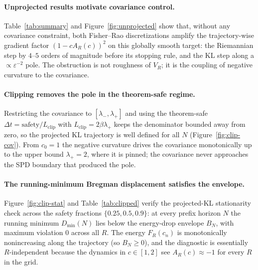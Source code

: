 \documentclass[11pt]{article}
\begin{document}
\begin{table}[t]
\centering
{}
\caption{Unprojected diagnostics. Riemannian rows report the maximum FR gradient
norm along each cascade and the stop reason; the KL row reports the log--log
pole-window slope; the BW rows report the final running minimum and envelope
check.}
\label{tab:summary}
\end{table}

\paragraph{Unprojected results motivate covariance control.}
Table~\ref{tab:summary} and Figure~\ref{fig:unprojected} show that, without any
covariance constraint, both Fisher--Rao discretizations amplify the
trajectory-wise gradient factor $(1-cA_R(c))^2$ on this globally smooth target:
the Riemannian step by $4$--$5$ orders of magnitude before its stopping rule, and
the KL step along a $\propto\varepsilon^{-2}$ pole. The obstruction is not
roughness of $V_R$; it is the coupling of negative curvature to the covariance.

\paragraph{Clipping removes the pole in the theorem-safe regime.}
Restricting the covariance to $[\lambda_-,\lambda_+]$ and using the theorem-safe
$\Delta t=\text{safety}/L_{\mathrm{clip}}$ with $L_{\mathrm{clip}}=2\beta\lambda_+$
keeps the denominator bounded away from zero, so the projected KL trajectory is
well defined for all $N$ (Figure~\ref{fig:clip-cov}). From $c_0=1$ the negative
curvature drives the covariance monotonically up to the upper bound $\lambda_+=2$,
where it is pinned; the covariance never approaches the SPD boundary that produced
the pole.

\paragraph{The running-minimum Bregman displacement satisfies the envelope.}
Figure~\ref{fig:clip-stat} and Table~\ref{tab:clipped} verify the projected-KL
stationarity check across the safety fractions $\{0.25,0.5,0.9\}$: at every prefix
horizon $N$ the running minimum $D_{\min}(N)$ lies below the energy-drop envelope
$B_N$, with maximum violation $0$ across all $R$. The
energy $F_R(c_n)$ is monotonically nonincreasing along the trajectory (so
$B_N\ge0$), and the diagnostic is essentially $R$-independent because the
dynamics in $c\in[1,2]$ see $A_R(c)\approx-1$ for every $R$ in the grid.
\end{document}
